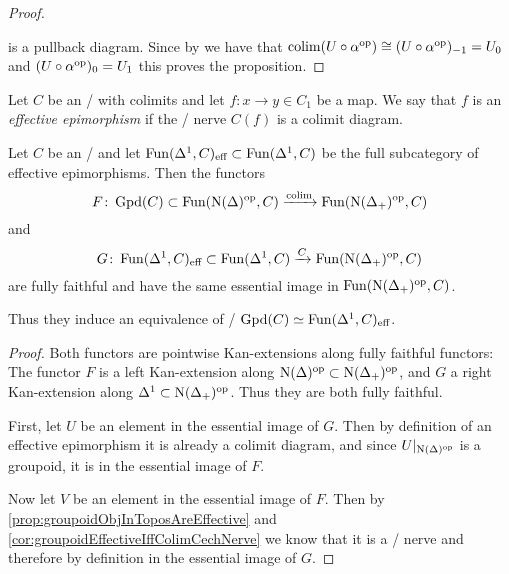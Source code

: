 \begin{prop}
\begin{proof}
\begin{center}
        \end{center}
        is a pullback diagram.
        Since by %
        we have that $\operatorname{colim} (U\circ\alpha^{\operatorname{op}})\cong(U\circ\alpha^{\operatorname{op}})_{-1} = U_0$ and $(U\circ\alpha^{\operatorname{op}})_0=U_1$ this proves the proposition.
    \end{proof}
\end{prop}
\begin{definition}
    Let $C$ be an \inftycat/ with colimits and let $f\colon x\to y\in C_1$ be a map.
    We say that $f$ is an \emph{effective epimorphism} if the \Cech/ nerve $C(f)$ is a colimit diagram.
\end{definition}
\begin{prop}\label{prop:mayRecognitionTheoremGroupoid}
    Let $C$ be an \inftytop/ and let $\operatorname{Fun}(\Delta^1,C)_{\text{eff}}\subset\operatorname{Fun}(\Delta^1,C)$ be the full subcategory of effective epimorphisms.  
    Then the functors
    \begin{equation*}
        F\colon\operatorname{Gpd}(C)\subset\operatorname{Fun}(\operatorname{N}(\Delta)^{\operatorname{op}},C)\xrightarrow{\operatorname{colim}}\operatorname{Fun}(\operatorname{N}(\Delta_+)^{\operatorname{op}},C)
    \end{equation*}
    and 
    \begin{equation*}
        G\colon\operatorname{Fun}(\Delta^1,C)_{\text{eff}}\subset\operatorname{Fun}(\Delta^1,C)\xrightarrow{C}\operatorname{Fun}(\operatorname{N}(\Delta_+)^{\operatorname{op}},C)
    \end{equation*}
    are fully faithful and have the same essential image in $\operatorname{Fun}(\operatorname{N}(\Delta_+)^{\operatorname{op}},C)$.
    
    Thus they induce an equivalence of \inftycats/ $\operatorname{Gpd}(C)\simeq\operatorname{Fun}(\Delta^1,C)_{\text{eff}}$.
    \begin{proof}
        Both functors are pointwise Kan-extensions along fully faithful functors:
        The functor $F$ is a left Kan-extension along $\operatorname{N}(\Delta)^{\operatorname{op}}\subset\operatorname{N}(\Delta_+)^{\operatorname{op}}$, and $G$ a right Kan-extension along $\Delta^1\subset\operatorname{N}(\Delta_+)^{\operatorname{op}}$.
        Thus they are both fully faithful.

        First, let $U$ be an element in the essential image of $G$. 
        Then by definition of an effective epimorphism it is already a colimit diagram, and since $U|_{\operatorname{N}(\Delta)^{\operatorname{op}}}$ is a groupoid, it is in the essential image of $F$.

        Now let $V$ be an element in the essential image of $F$. 
        Then by \cref{prop:groupoidObjInToposAreEffective} and \cref{cor:groupoidEffectiveIffColimCechNerve} we know that it is a \Cech/ nerve and therefore by definition in the essential image of $G$.
    \end{proof}
\end{prop}
